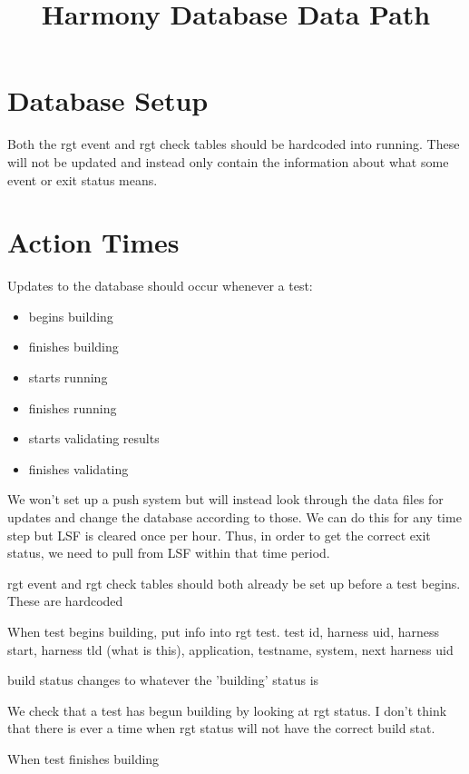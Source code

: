 \documentclass{article}
\title{Harmony Database Data Path}
\begin{document}
\section{Database Setup}

Both the rgt event and rgt check tables should be hardcoded into running. These will not be updated and instead only contain the information about what some event or exit status means.

\section{Action Times}

Updates to the database should occur whenever a test:
\begin{itemize}
	\item begins building
	\item finishes building
	\item starts running
	\item finishes running
	\item starts validating results
	\item finishes validating
\end{itemize}

We won't set up a push system but will instead look through the data files for updates and change the database according to those. We can do this for any time step but LSF is cleared once per hour. Thus, in order to get the correct exit status, we need to pull from LSF within that time period.

rgt event and rgt check tables should both already be set up before a test begins. These are hardcoded

When test begins building, put info into rgt test.
	test id, harness uid, harness start, harness tld (what is this), application, testname, system, next harness uid	

	build status changes to whatever the 'building' status is


We check that a test has begun building by looking at rgt status. I don't think that there is ever a time when rgt status will not have the correct build stat.


When test finishes building
\end{document}
